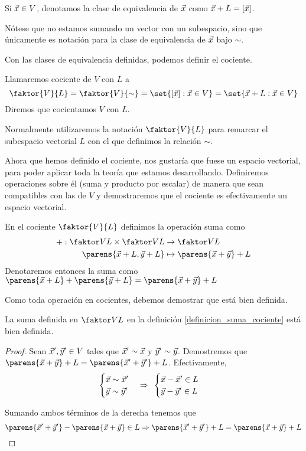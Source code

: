 \documentclass[../algebra_lineal.tex]{subfiles}
\begin{document}
\begin{notation}
    Si $\vec{x} \in V$, denotamos la clase de equivalencia de $\vec{x}$ como $\vec{x} + L = [\vec{x}]$. 
\end{notation}

Nótese que no estamos sumando un vector con un subespacio, sino que únicamente es notación para la clase de equivalencia de $\vec{x}$ bajo $\sim$.

Con las clases de equivalencia definidas, podemos definir el cociente.
\begin{definition}[Cociente]
    Llamaremos cociente de $V$ con $L$ a
    \[
        \faktor{V}{L} = \faktor{V}{\sim} = \set{[\vx] : \vx \in V} = \set{\vx + L : \vx \in V}
     \]
     Diremos que cocientamos $V$ con $L$.
\end{definition}

Normalmente utilizaremos la notación $\faktor{V}{L}$ para remarcar el subespacio vectorial $L$ con el que definimos la relación $\sim$.

Ahora que hemos definido el cociente, nos gustaría que fuese un espacio vectorial, para poder aplicar toda la teoría que estamos desarrollando. Definiremos operaciones sobre él (suma y producto por escalar) de manera que sean compatibles con las de $V$ y demostraremos que el cociente es efectivamente un espacio vectorial.

\begin{definition}
    \label{definicion_suma_cociente}
    En el cociente $\faktor{V}{L}$ definimos la operación suma como
    \begin{align*}
        + : \qs{V}{L} \times \qs{V}{L} & \to \qs{V}{L} \\
            \parens{\vx + L, \vy + L } & \mapsto \parens{\vx + \vy} + L
    \end{align*}
    Denotaremos entonces la suma como $\parens{\vx + L} + \parens{\vy + L} = \parens{\vx + \vy} + L$
\end{definition}

Como toda operación en cocientes, debemos demostrar que está bien definida.
\begin{proposition}
    La suma definida en $\qs{V}{L}$ en la definición \ref{definicion_suma_cociente} está bien definida.
\end{proposition}
\begin{proof}
    Sean $\vec{x}', \vec{y}' \in V$ tales que $\vec{x}' \sim \vec{x}$ y $\vec{y}' \sim \vec{y}$. Demostremos que $\parens{\vx + \vy} + L = \parens{\vx' + \vy'}+L$. Efectivamente,
    \[
        \begin{cases}
            \vec{x} \sim \vec{x}' \\
            \vec{y} \sim \vec{y}' 
        \end{cases} \Rightarrow \hspace{1.5mm}
        \begin{cases}
            \vec{x} - \vec{x}' \in L \\
            \vec{y} - \vec{y}' \in L
        \end{cases}
    \]

    Sumando ambos términos de la derecha tenemos que 
    \[
        \parens{\vx' + \vy'} - \parens{\vx + \vy} \in L \Rightarrow \parens{\vx'+\vy'} + L = \parens{\vx + \vy} + L
    \]
\end{proof}
\end{document}
